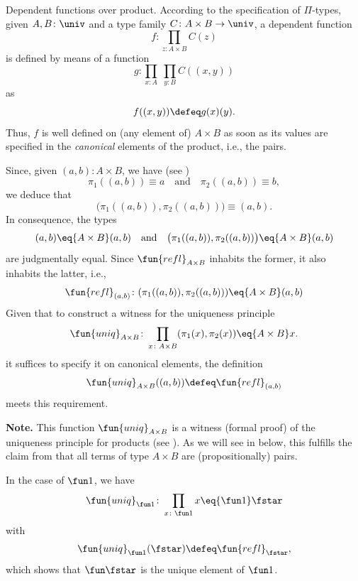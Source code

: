\begin{lpar}{Dependent functions over product.}\label{lpar:Pi-types-over-product}
    According to the specification of $\Pi$-types, given $A,B\colon\univ$ and a type family $C\colon A\times B\to\univ$, a dependent function
    \[
        f\colon\prod_{z\colon A\times B}C(z)
    \]
    is defined by means of a function 
    \[
        g\colon\prod_{x\colon A}\;\prod_{y\colon B}C((x,y))
    \]
    as
    \[
        f((x,y))\defeq g(x)(y).
    \]
    Thus, $f$ is well defined on (any element of) $A\times B$ as soon as its values are specified in the \textsl{canonical} elements of the product, i.e., the pairs.
    
    Since, given $(a,b)\colon A\times B$, we have (see )
    \[
        \pi_1((a,b))\equiv a\quad\text{and}\quad
        \pi_2((a,b))\equiv b,
    \]
    we deduce that
    \[
        \bigl(\pi_1((a,b)),\pi_2((a,b))\bigr)\equiv(a,b).
    \]
    In consequence, the types
    \[
        (a,b)\eq{A\times B}(a,b)\quad\text{and}\quad
        \bigl(\pi_1((a,b)),\pi_2((a,b))\bigr)\eq{A\times B}(a,b)
    \]
    are judgmentally equal. Since $\fun{refl}_{A\times B}$ inhabits the former, it also inhabits the latter, i.e.,
    \[
        \fun{refl}_{(a,b)}\colon
            (\pi_1((a,b)),\pi_2((a,b)))\eq{A\times B}(a,b)
    \]
    Given that to construct a witness for the uniqueness principle
    \[
        \fun{uniq}_{A\times B}\colon\prod_{x\colon A\times B}
            (\pi_1(x),\pi_2(x))\eq{A\times B}x.
    \]
    it suffices to specify it on canonical elements, the definition
    \[
        \fun{uniq}_{A\times B}((a,b))\defeq\fun{refl}_{(a,b)}
    \]
    meets this requirement.
    
    \textbf{Note.} This function $\fun{uniq}_{A\times B}$ is a witness (formal proof) of the uniqueness principle for products (see ). As we will see in  below, this fulfills the claim from  that all terms of type $A \times B$ are (propositionally) pairs.
    
    In the case of $\fun1$, we have
    \[
        \fun{uniq}_{\fun1}\colon\prod_{x\colon\fun1}
            x\eq{\fun1}\fstar
    \]
    with
    \[
        \fun{uniq}_{\fun1}(\fstar)\defeq\fun{refl}_\fstar,
    \]
    which shows that $\fun\fstar$ is the unique element of $\fun1$.
\end{lpar}

